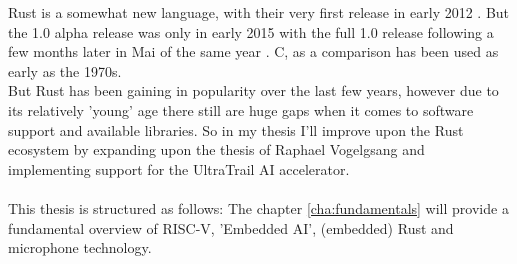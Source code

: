 

Rust \cite{rustlang} is a somewhat new language,
with their very first release in early 2012 \cite{rust_releases}.
But the 1.0 alpha release was only in early 2015 \cite{rust_releases}
with the full 1.0 release following a few months later in Mai of the same year \cite{rust_releases}.
C, as a comparison has been used as early as the 1970s.\\
But Rust has been gaining in popularity \cite{rust_popularity} over the last few years, however
due to its relatively 'young' age there still are huge gaps when it comes to software support and available libraries.
So in my thesis I'll improve upon the Rust ecosystem by expanding upon the thesis of Raphael Vogelgsang \cite{rust_pulp}
and implementing support for the UltraTrail \cite{ultratrail} AI accelerator.
\\\\
This thesis is structured as follows:
The chapter \ref{cha:fundamentals} will provide a fundamental overview of RISC-V, 'Embedded AI', (embedded) Rust and microphone technology.


